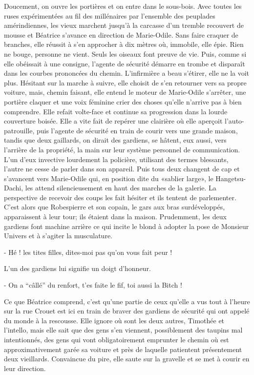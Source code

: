 Doucement, on ouvre les portières et on entre dans le sous-bois. Avec toutes les ruses expérimentées au fil des millénaires par l’ensemble des peuplades amérindiennes, les vieux marchent jusqu’à la carcasse d’un tremble recouvert de mousse et Béatrice s’avance en direction de Marie-Odile. Sans faire craquer de branches, elle réussit à s’en approcher à dix mètres où, immobile, elle épie. Rien ne bouge, personne ne vient. Seuls les oiseaux font preuve de vie. Puis, comme si elle obéissait à une consigne, l’agente de sécurité démarre en trombe et disparaît dans les courbes prononcées du chemin. L’infirmière a beau s’étirer, elle ne la voit plus. Hésitant sur la marche à suivre, elle choisit de s’en retourner vers sa propre voiture, mais, chemin faisant, elle entend le moteur de Marie-Odile s’arrêter, une portière claquer et une voix féminine crier des choses qu’elle n’arrive pas à bien comprendre. Elle refait volte-face et continue sa progression dans la lourde couverture boisée. Elle a vite fait de repérer une clairière où elle aperçoit l’auto-patrouille, puis l’agente de sécurité en train de courir vers une grande maison, tandis que deux gaillards, on dirait des gardiens, se hâtent, eux aussi, vers l’arrière de la propriété, la main sur leur système personnel de communication. L’un d’eux invective lourdement la policière, utilisant des termes blessants, l’autre ne cesse de parler dans son appareil. Puis tous deux changent de cap et s’avancent vers Marie-Odile qui, en position dite du «sablier large», le Hangetsu-Dachi, les attend silencieusement en haut des marches de la galerie. La perspective de recevoir des coups les fait hésiter et ils tentent de parlementer. C’est alors que Robespierre et son copain, le gars aux bras surdéveloppés, apparaissent à leur tour; ils étaient dans la maison. Prudemment, les deux gardiens font machine arrière ce qui incite le blond à adopter la pose de Monsieur Univers et à s’agiter la musculature.

- Hé ! les tites filles, dites-moi pas qu’on vous fait peur !

L’un des gardiens lui signifie un doigt d’honneur.

- On a “câllé” du renfort, t’es faite le fif, toi aussi la Bitch !

Ce que Béatrice comprend, c’est qu’une partie de ceux qu’elle a vus tout à l’heure sur la rue Crouet est ici en train de braver des gardiens de sécurité qui ont appelé du monde à la rescousse. Elle ignore où sont les deux autres, Timothée et l’intello, mais elle sait que des gens s’en viennent, possiblement des taupins mal intentionnés, des gens qui vont obligatoirement emprunter le chemin où est approximativement garée sa voiture et près de laquelle patientent présentement deux vieillards. Convaincue du pire, elle saute sur la gravelle et se met à courir en leur direction.

